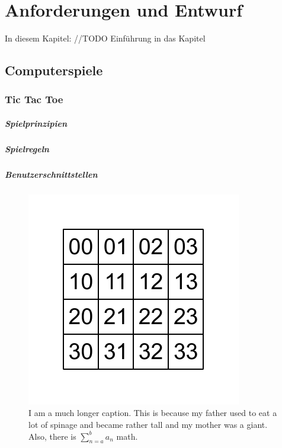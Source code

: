 \chapter{Anforderungen und Entwurf}
\label{cha:anforderungen-entwurf}

In diesem Kapitel: //TODO Einführung in das Kapitel

\section{Computerspiele}
\label{sec:computerspiele}

\subsection{Tic Tac Toe}
\paragraph{Spielprinzipien}

\paragraph{Spielregeln}

\paragraph{Benutzerschnittstellen}
\begin{figure}[htbp]
  \centering
  \includegraphics[width=\textwidth]{inhalt/abbildungen/vier_mal_vier_matrix.pdf}
  \caption{I am a much longer caption. This is because my father used to
    eat a lot of spinage and became rather tall and my mother was a
    giant. Also, there is $\sum^b_{n=a} a_n$ math.}
  \label{fig:4x4matrix}
\end{figure}

